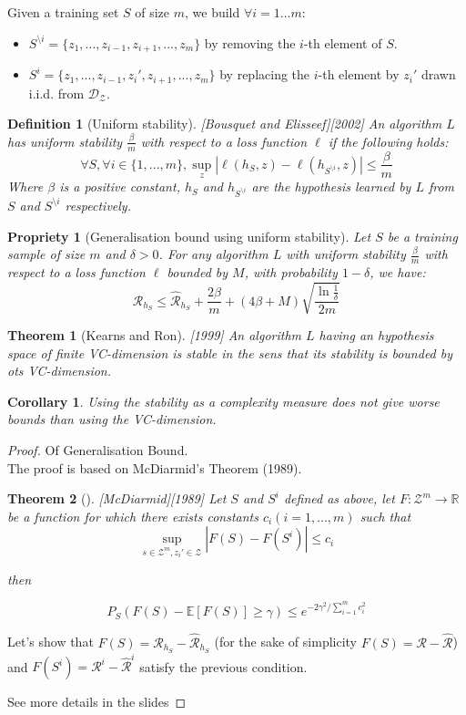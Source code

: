 \documentclass{article}
\newtheorem{thm}{Theorem}
\newtheorem{prop}{Propriety}
\newtheorem{defi}{Definition}
\newtheorem{coro}{Corollary}
\begin{document}
Given a training set $S$ of size $m$, we build $\forall i =1 ... m$:
\begin{itemize}
\item $S^{\setminus i}= \{ z_1,...,z_{i-1}, z_{i+1},...,z_m\}$ by removing the $i$-th element of $S$.
\item $S^{i}= \{ z_1,...,z_{i-1},z_i',z_{i+1},...,z_m\}$ by replacing the $i$-th element by $z_i'$ drawn i.i.d. from $\mathcal{D}_{\mathcal{Z}}$.
\end{itemize}


\begin{defi}[Uniform stability][Bousquet and Elisseef][2002]
An algorithm $L$ has uniform stability $\frac{\beta}{m}$ with respect to a loss function $\ell$ if the following holds:
\[\forall S, \forall i \in \{1,...,m\}, \sup_{z} |\ell(h_S,z)-\ell(h_{S^{\setminus i}},z)|\leq \frac{\beta}{m}\]
Where $\beta$ is a positive constant, $h_S$ and $h_{S^{\setminus i}}$ are the hypothesis learned by $L$ from $S$ and $S^{\setminus i}$ respectively.
\end{defi}

\begin{prop}[Generalisation bound using uniform stability]
Let $S$ be a training sample of size $m$ and $\delta>0$. For any algorithm $L$ with uniform stability $\frac{\beta}{m}$ with respect to a loss function $\ell$ bounded by $M$, with probability $1-\delta$, we have:
\[\mathcal{R}_{h_S}\leq \hat{\mathcal{R}}_{h_S}+\frac{2\beta}{m}+(4\beta+M)\sqrt{ \frac{ \ln \frac{1}{\delta}}{2m} }\]
\end{prop}

\begin{thm}[Kearns and Ron][1999]
An algorithm $L$ having an hypothesis space of finite VC-dimension is stable in the sens that its stability is bounded by ots VC-dimension.
\end{thm}

\begin{coro}
Using the stability as a complexity measure does not give worse bounds than using the VC-dimension.
\end{coro}

\begin{proof}Of Generalisation Bound.\\
The proof is based on McDiarmid's Theorem (1989).
\begin{thm}[][McDiarmid][1989]
Let $S$ and $S^i$ defined as above, let $F : \mathcal{Z}^m \to \mathbb{R}$ be a function for which
there exists constants $c_i (i = 1, ...,m)$ such that
\[\sup_{s\in \mathcal{Z}^m,z_i'\in \mathcal{Z}}|F(S)-F(S^i)|\leq c_i\]

then

\[P_S(F(S)-\mathbb{E}[F(S)]\geq \gamma) \leq e^{-2\gamma^2/\sum_{i=1}^{m} c_i^2}\]

\end{thm}
Let's show that $F(S) = \mathcal{R}_{h_S}-\hat{\mathcal{R}}_{h_S}$ (for the sake of simplicity
$F(S) = \mathcal{R} - \hat{\mathcal{R}}$) and $F(S^i ) = \mathcal{R}^i - \hat{\mathcal{R}}^i$ satisfy the previous condition.

See more details in the slides
\end{proof}
\end{document}

